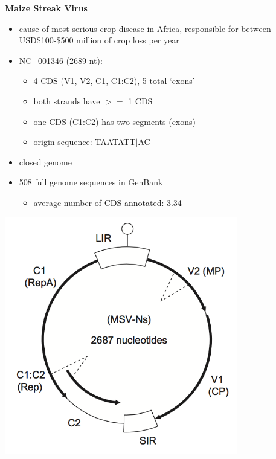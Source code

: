 \documentclass[landscape]{slides}
\begin{document}
\begin{slide}
\begin{center}
\textbf{Maize Streak Virus}

\begin{minipage}[c]{6in}
\tiny
\begin{itemize}
\item cause of most serious crop disease in Africa, responsible for
  between USD\$100-\$500 million of crop loss per year
\item NC\_001346 (2689 nt):
  \begin{itemize}
    \item 4 CDS (V1, V2, C1, C1:C2), 5 total ‘exons’
    \item both strands have $>=$ 1 CDS
    \item one CDS (C1:C2) has two segments (exons)
    \item origin sequence: TAATATT$|$AC
  \end{itemize}
\item closed genome
\item 508 full genome sequences in GenBank
\begin{itemize}
  \item average number of CDS annotated: 3.34
\end{itemize}
\end{itemize}
\vspace{2in}
\end{minipage}
\begin{minipage}[c]{4in}
\includegraphics[width=4in]{figs/msv-genome-small}
\tiny {}
\vspace{2in}
\end{minipage}

\vfill
\end{center}
\end{slide}
\end{document}
